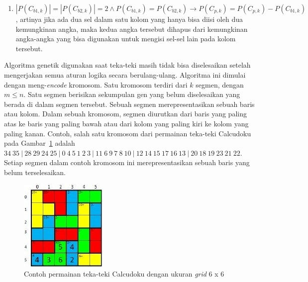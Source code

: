 \begin{enumerate}
\item \begin{math}|P(C_{b1,k})| = |P(C_{b2,k})| = 2 \land P(C_{b1,k}) = P(C_{b2,k}) \rightarrow P(C_{p,k}) = P(C_{p,k}) - P(C_{b1,k})\end{math}, artinya jika ada dua sel dalam satu kolom yang hanya bisa diisi oleh dua kemungkinan angka, maka kedua angka tersebut dihapus dari kemungkinan angka-angka yang bisa digunakan untuk mengisi sel-sel lain pada kolom tersebut.
\end{enumerate}

Algoritma genetik digunakan saat teka-teki masih tidak bisa diselesaikan setelah mengerjakan semua aturan logika secara berulang-ulang. Algoritma ini dimulai dengan meng-\textit{encode} kromosom. Satu kromosom terdiri dari \begin{math}k\end{math} segmen, dengan \begin{math}m \leq n\end{math}. Satu segmen berisikan sekumpulan gen yang belum diselesaikan yang berada di dalam segmen tersebut. Sebuah segmen merepresentasikan sebuah baris atau kolom. Dalam sebuah kromosom, segmen diurutkan dari baris yang paling atas ke baris yang paling bawah atau dari kolom yang paling kiri ke kolom yang paling kanan. Contoh, salah satu kromosom dari permainan teka-teki Calcudoku pada Gambar~\ref{fig:hybrid8} adalah \begin{math}34 \ 35 \ | \ 28 \ 29 \ 24 \ 25 \ | \ 0 \ 4 \ 5 \ 1 \ 2 \ 3 \ | \ 11 \ 6 \ 9 \ 7 \ 8 \ 10 \ | \ 12 \ 14 \ 15 \ 17 \ 16 \ 13 \ | \ 20 \ 18 \ 19 \ 23 \ 21 \ 22\end{math}. Setiap segmen dalam contoh kromosom ini merepresentasikan sebuah baris yang belum terselesaikan.

\begin{figure}
\centering
\captionsetup{justification=centering}
\includegraphics[scale=1]{Gambar/HybridGenetic8}
\caption[Contoh permainan teka-teki Calcudoku dengan ukuran \textit{grid} 6 x 6~\cite{johanna:12:hybrid}]{Contoh permainan teka-teki Calcudoku dengan ukuran \textit{grid} 6 x 6 ~\cite{johanna:12:hybrid}}
\label{fig:hybrid8}
\end{figure}


